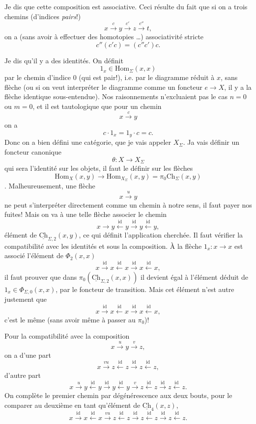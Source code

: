 \documentclass[11pt]{article}
\newcommand{\printedpage}[1]{\marginpar{\footnotesize p.~#1}}
\newcommand{\msp}[1]{\marginpar{\footnotesize [#1]}}
\newcommand{\Hom}{\mathrm{Hom}}
\newcommand{\uCh}{\underline{\mathrm{Ch}}}
\begin{document}
\msp{page 22}Je dis que cette composition est associative. Ceci résulte du fait que si on a trois chemins (d'indices \textit{pairs}!)
\[
x \xrightarrow{c} y \xrightarrow{c'} z \xrightarrow{c''} t,
\]
on a (sans avoir à effectuer des homotopies \dots) associativité stricte
\[
c''(c'c) = (c''c')c.
\]

Je dis qu'il y a des identités. On définit
\[
1_x \in \Hom_\Sigma(x,x)
\]
par le chemin d'indice 0 (qui est pair!), i.e. par le diagramme réduit à $x$, sans flèche (ou si on veut interpréter le diagramme comme un foncteur $e \longrightarrow X$, il y a la flèche identique sous-entendue). Nos raisonnements n'excluaient pas le cas $n = 0$ ou $m = 0$, et il est tautologique que pour un chemin
\[
x \xrightarrow{c} y
\]
on a
\[
c \cdot 1_x = 1_y \cdot c = c.
\]
Donc on a bien défini une catégorie, que je vais appeler $X_\Sigma$. Ja vais définir un foncteur canonique %
\[
\theta : X \longrightarrow X_\Sigma
\]
qui sera l'identité sur les objets, il faut le définir sur les flèches
\[
\Hom_X(x,y) \longrightarrow \Hom_{X_\Sigma}(x,y) = \pi_0\mathrm{Ch}_\Sigma(x,y)
\]
. Malheureusement, une flèche
\[
x \xrightarrow{u} y
\]
\msp{page 23}ne peut s'interpréter directement comme un chemin à notre sens, il faut payer nos fuites! Mais on va à une telle flèche associer le chemin
\[
x \longrightarrow y \xleftarrow{\mathrm{id}} y \xrightarrow{\mathrm{id}} y \xleftarrow{\mathrm{id}} y,
\]
\printedpage{15}
élément de $\uCh_{\Sigma,2}(x,y)$, ce qui définit l'application cherchée. Il faut vérifier la compatibilité avec les identités et sous la composition. À la flèche $1_x : x \longrightarrow x$ est associé l'élément de $\Phi_2(x,x)$
\[
x \xrightarrow{\mathrm{id}} x \xleftarrow{\mathrm{id}} x \xrightarrow{\mathrm{id}} x \xleftarrow{\mathrm{id}} x,
\]
il faut prouver que dans $\pi_0(\uCh_{\Sigma,2}(x,x))$ il devient égal à l'élément déduit de $1_x \in \Phi_{\Sigma,0}(x,x)$, par le foncteur de transition. Mais cet élément n'est autre justement que
\[
x \xrightarrow{\mathrm{id}} x \xleftarrow{\mathrm{id}} x \xrightarrow{\mathrm{id}} x \xleftarrow{\mathrm{id}} x,
\]
c'est le même (sans avoir même à passer au $\pi_0$)!

Pour la compatibilité avec la composition
\[
x \xrightarrow{u} y \xrightarrow{v} z,
\]
on a d'une part
\[
x \xrightarrow{vu} z \xleftarrow{\mathrm{id}} z \xrightarrow{\mathrm{id}} z \xleftarrow{\mathrm{id}} z,
\]
d'autre part
\[
x \xrightarrow{u} y \xleftarrow{\mathrm{id}} y \xrightarrow{\mathrm{id}} y \xleftarrow{\mathrm{id}} y \xrightarrow{v} z \xleftarrow{\mathrm{id}} z \xrightarrow{\mathrm{id}} z \xleftarrow{\mathrm{id}} z.
\]
On complète le premier chemin par dégénérescence aux deux bouts, pour le comparer au deuxième en tant qu'élément de $\uCh_4(x,z)$,
\[
x \xrightarrow{\mathrm{id}} x \xleftarrow{\mathrm{id}} x \xrightarrow{vu} z \xleftarrow{\mathrm{id}} z \xrightarrow{\mathrm{id}} z \xleftarrow{\mathrm{id}} z \xrightarrow{\mathrm{id}} z \xleftarrow{\mathrm{id}} z.
\]
\end{document}
